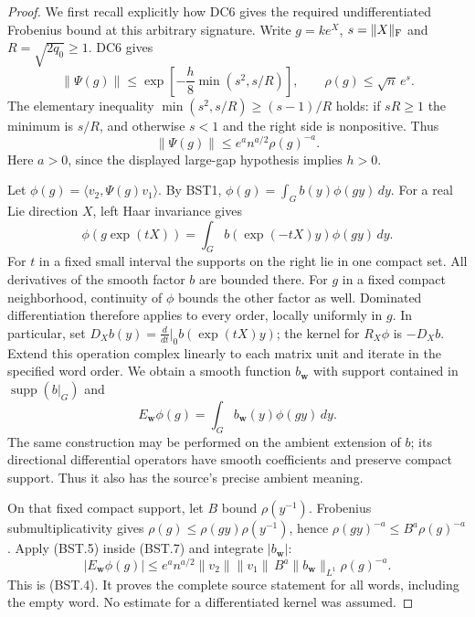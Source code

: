 \begin{proof}
We first recall explicitly how DC6 gives the required undifferentiated
Frobenius bound at this arbitrary signature.  Write $g=ke^X$,
$s=\|X\|_{\rm F}$ and $R=\sqrt{2q_0}\ge1$.  DC6 gives
\[
 \|\Psi(g)\|\le
  \exp\left[-\frac h8\min(s^2,s/R)\right],
 \qquad \rho(g)\le\sqrt n\,e^s.
\]
The elementary inequality
$\min(s^2,s/R)\ge(s-1)/R$ holds: if $sR\ge1$ the minimum
is $s/R$, and otherwise $s<1$ and the right side is nonpositive.
Thus
\[
           \|\Psi(g)\|\le e^a n^{a/2}\rho(g)^{-a}.
 \tag{BST.5}
\]
Here $a>0$, since the displayed large-gap hypothesis implies $h>0$.

Let $\phi(g)=\langle v_2,\Psi(g)v_1\rangle$.
By BST1, $\phi(g)=\int_G b(y)\phi(gy)\,dy$.
For a real Lie direction $X$, left Haar invariance gives
\[
 \phi(g\exp(tX))
    =\int_G b(\exp(-tX)y)\phi(gy)\,dy.
 \tag{BST.6}
\]
For $t$ in a fixed small interval the supports on the right lie in
one compact set.  All derivatives of the smooth factor $b$ are
bounded there.  For $g$ in a fixed compact neighborhood, continuity
of $\phi$ bounds the other factor as well.  Dominated differentiation
therefore applies to every order, locally uniformly in $g$.
In particular, set
$D_Xb(y)=\frac{d}{dt}|_{0}b(\exp(tX)y)$; the kernel for $R_X\phi$
is $-D_Xb$.  Extend this operation complex linearly to each
matrix unit and iterate in the specified word order.  We obtain a
smooth function $b_{\mathbf w}$ with support contained in
$\operatorname{supp}(b|_G)$ and
\[
 E_{\mathbf w}\phi(g)=
           \int_G b_{\mathbf w}(y)\phi(gy)\,dy .
 \tag{BST.7}
\]
The same construction may be performed on the ambient extension of
$b$; its directional differential operators have smooth coefficients
and preserve compact support.  Thus it also has the source's precise
ambient meaning.

On that fixed compact support, let $B$ bound $\rho(y^{-1})$.
Frobenius submultiplicativity gives
$\rho(g)\le\rho(gy)\rho(y^{-1})$, hence
$\rho(gy)^{-a}\le B^a\rho(g)^{-a}$.
Apply (BST.5) inside (BST.7) and integrate
$|b_{\mathbf w}|$:
\[
 |E_{\mathbf w}\phi(g)|
 \le e^a n^{a/2}\|v_2\|\|v_1\|\,
       B^a\|b_{\mathbf w}\|_{L^1}\rho(g)^{-a}.
\]
This is (BST.4).  It proves the complete source statement for all
words, including the empty word.  No estimate for a differentiated
kernel was assumed.
\end{proof}


